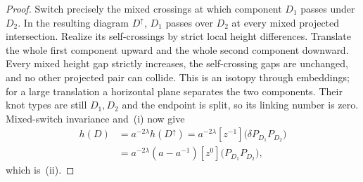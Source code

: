 \begin{proof}
Switch precisely the mixed crossings at which component $D_1$ passes under
$D_2$. In the resulting diagram $D^\uparrow$, $D_1$ passes over $D_2$ at every
mixed projected intersection. Realize its self-crossings by strict local height
differences. Translate the whole first component upward and the whole second
component downward. Every mixed height gap strictly increases, the
self-crossing gaps are unchanged, and no other projected pair can collide.
This is an isotopy through embeddings; for a large translation a horizontal
plane separates the two components. Their knot types are still $D_1,D_2$ and
the endpoint is split, so its linking number is zero. Mixed-switch invariance
and~(i) now give
\[
\begin{aligned}
 h(D)
 &=a^{-2\lambda}h(D^\uparrow)
  =a^{-2\lambda}[z^{-1}]
       \bigl(\delta P_{D_1}P_{D_2}\bigr)\\
 &=a^{-2\lambda}(a-a^{-1})
       [z^0]\bigl(P_{D_1}P_{D_2}\bigr),
\end{aligned}
\]
which is~(ii).
\end{proof}

